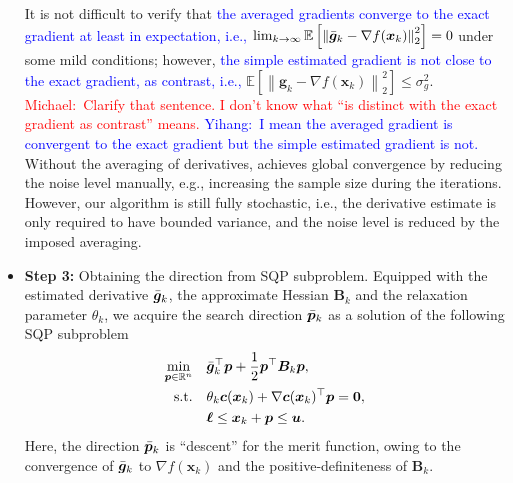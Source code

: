 \documentclass[aos]{imsart}
\numberwithin{equation}{section}
\theoremstyle{plain}
\newcommand{\michael}[1]{\textcolor{red}{Michael:\ #1}}
\newcommand{\yihang}[1]{\textcolor{blue}{Yihang:\ #1}}
\begin{document}
\begin{itemize}
It is not difficult to verify that \textcolor{blue}{the averaged gradients converge to the exact gradient at least in expectation, i.e., }$ \lim_{k \to \infty} \mathbb{E} \left[ \left\| \Bar{\bm{g}}_k - \nabla f(\bm{x}_k)\right\|_2^2 \right] = 0$ under some mild conditions; however, \textcolor{blue}{the simple estimated gradient is not close to the exact gradient, as contrast, i.e., } $\mathbb{E} \left[ \left\|  \bm{g}_k - \nabla f(\bm{x}_k)\right\|_2^2 \right] \leq \sigma_g^2$.
\michael{Clarify that sentence. I don't know what ``is distinct with the exact gradient as contrast'' means.}
\yihang{I mean the averaged gradient is convergent to the exact gradient but the simple estimated gradient is not.}
Without the averaging of derivatives, \cite{curtis2023sequential} achieves global convergence by reducing the noise level manually, e.g., increasing the sample size during the iterations. However, our algorithm is still fully stochastic, i.e., the derivative estimate is only required to have bounded variance, and the noise level is reduced by the imposed averaging. 

    \item \textbf{Step 3:} Obtaining the direction from SQP subproblem. Equipped with the estimated derivative $\Bar{\bm{g}}_k$, the approximate Hessian $\bm{B}_k$ and the relaxation parameter $\theta_k$, we acquire the search direction $\Bar{\bm{p}}_k$ as a solution of the following SQP subproblem
    \begin{equation}
    \label{relaxed_sqp_subproblem_stoch}
    \begin{split}
        \min_{\bm{p} \in \mathbb{R}^{n}} & \hspace{1em} \Bar{\bm{g}}_k^{\top}\bm{p}+ \frac{1}{2}\bm{p}^{\top}\bm{B}_k\bm{p},\\
        \text{s.t.} & \hspace{1em} \theta_k \bm{c}(\bm{x}_k)+\nabla \bm{c}(\bm{x}_k)^{\top}\bm{p} = \bm{0},\\
        & \hspace{1em} \bm{\ell} \leq \bm{x}_k + \bm{p} \leq \bm{u}.
    \end{split}    
\end{equation} 
Here, the direction $\Bar{\bm{p}}_k$ is ``descent'' for the merit function, owing to the convergence of  $\Bar{\bm{g}}_k$ to $\nabla f(\bm{x}_k)$ and the positive-definiteness of $\bm{B}_k$. 
    


\end{itemize}
\end{document}
